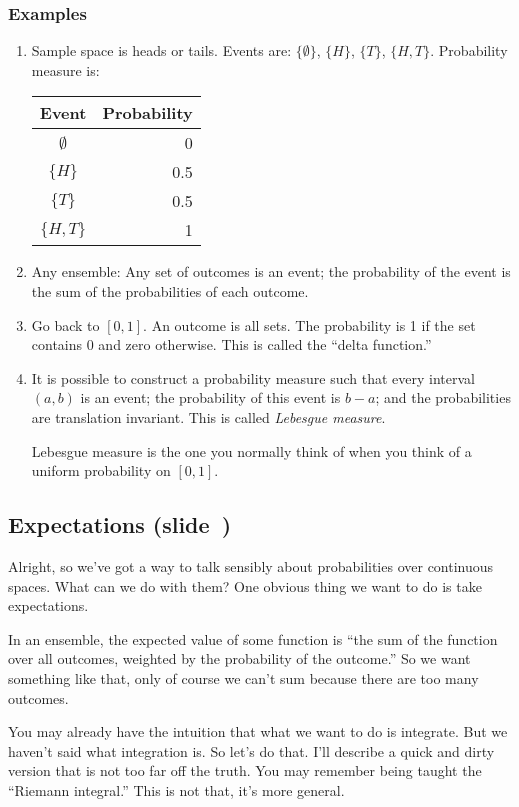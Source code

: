 \documentclass[11pt]{article}
\begin{document}
\subsubsection*{Examples}
\begin{enumerate}
\item Sample space is heads or tails. Events are: $\{\emptyset\}$, $\{H\}$, $\{T\}$,
  $\{H, T\}$. Probability measure is:

  \begin{tabular}{cr}
    \toprule
    Event & Probability \\
    \midrule
    $\emptyset$ & 0 \\
    $\{H\}$ & 0.5 \\
    $\{T\}$ & 0.5 \\
    $\{H, T\}$ & 1 \\
    \bottomrule
  \end{tabular}
\item Any ensemble: Any set of outcomes is an event; the probability of the
  event is the sum of the probabilities of each outcome.
\item Go back to $[0,1]$. An outcome is all sets. The probability is 1 if the
  set contains 0 and zero otherwise. This is called the “delta function.”
\item It is possible to construct a probability measure such that every interval
  $(a,b)$ is an event; the probability of this event is $b-a$; and the
  probabilities are translation invariant. This is called \emph{Lebesgue
  measure}.

  Lebesgue measure is the one you normally think of when you think of a uniform
  probability on $[0,1]$.
\end{enumerate}

\newpage
\subsection*{Expectations (slide~\pageref{slide:expectations})}

Alright, so we've got a way to talk sensibly about probabilities over continuous
spaces. What can we do with them? One obvious thing we want to do is take
expectations.

In an ensemble, the expected value of some function is “the sum of the function
over all outcomes, weighted by the probability of the outcome.” So we want
something like that, only of course we can't sum because there are too many
outcomes.

You may already have the intuition that what we want to do is integrate. But we
haven't said what integration is. So let's do that. I'll describe a quick and
dirty version that is not too far off the truth. You may remember being taught
the ``Riemann integral.'' This is not that, it's more general.
\end{document}
